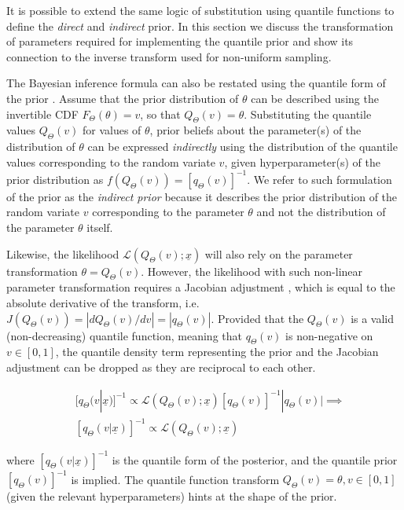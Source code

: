 \documentclass[ba]{imsart}
\numberwithin{equation}{section}
\theoremstyle{plain}
\begin{document}
It is possible to extend the same logic of substitution using quantile functions to define the \emph{direct} and \emph{indirect} prior. In this section we discuss the transformation of parameters required for implementing the quantile prior and show its connection to the inverse transform used for non-uniform sampling.

The Bayesian inference formula can also be restated using the quantile form of the prior \citep{nair2020BayesianInferenceQuantile}. Assume that the prior distribution of \(\theta\) can be described using the invertible CDF \(F_\Theta(\theta)=v\), so that \(Q_\Theta(v)=\theta\). Substituting the quantile values \(Q_\Theta(v)\) for values of \(\theta\), prior beliefs about the parameter(s) of the distribution of \(\theta\) can be expressed \emph{indirectly} using the distribution of the quantile values corresponding to the random variate \(v\), given hyperparameter(s) of the prior distribution as \(f(Q_\Theta(v))=[q_\Theta(v)]^{-1}\). We refer to such formulation of the prior as the \emph{indirect prior} because it describes the prior distribution of the random variate \(v\) corresponding to the parameter \(\theta\) and not the distribution of the parameter \(\theta\) itself.

Likewise, the likelihood \(\mathcal{L}(Q_\Theta(v);\underline{x})\) will also rely on the parameter transformation \(\theta=Q_\Theta(v)\). However, the likelihood with such non-linear parameter transformation requires a Jacobian adjustment \citep{andrilli2010ElementaryLinearAlgebra}, which is equal to the absolute derivative of the transform, i.e.~\(J(Q_\Theta(v))=|dQ_\Theta(v)/dv|=|q_\Theta(v)|\). Provided that the \(Q_\Theta(v)\) is a valid (non-decreasing) quantile function, meaning that \(q_\Theta(v)\) is non-negative on \(v \in [0,1]\), the quantile density term representing the prior and the Jacobian adjustment can be dropped as they are reciprocal to each other.

\[ 
\begin{aligned}\;
&[q_\Theta(v|\underline{x})]^{-1} \propto \mathcal{L}(Q_\Theta(v);\underline{x})[q_\Theta(v)]^{-1}|q_\Theta(v)| \implies\\
&[q_\Theta(v|\underline{x})]^{-1} \propto \mathcal{L}(Q_\Theta(v);\underline{x})
\end{aligned}
\label{eq:bayesidqfeq}
\]

where \([q_\Theta(v|\underline{x})]^{-1}\) is the quantile form of the posterior, and the quantile prior \([q_\Theta(v)]^{-1}\) is implied. The quantile function transform \(Q_\Theta(v)=\theta,v \in [0,1]\) (given the relevant hyperparameters) hints at the shape of the prior.
\end{document}
